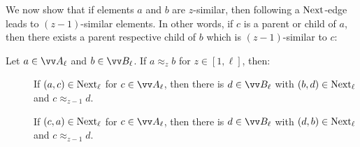 We now show that if elements $a$ and $b$ are $z$-similar, then following a $\mathrm{Next}$-edge leads to $(z-1)$-similar elements.
In other words, if $c$ is a parent or child of $a$, then there exists a parent respective child of $b$ which is $(z-1)$-similar to $c$:
\begin{lemma}
  Let $a \in \unraveldom{A}_{\ell}$ and $b \in \unraveldom{B}_{\ell}$. If $a \approx_{z} b$ for $z \in [1,\ell]$, then:
  \begin{description}
  \item[] If $(a, c) \in \mathrm{Next}_{\ell}$ for $c \in \unraveldom{A}_{\ell}$, then there is $d \in \unraveldom{B}_{\ell}$ with $(b, d) \in \mathrm{Next}_{\ell}$ and $c \approx_{z-1} d$.
  \item[] If $(c, a) \in \mathrm{Next}_{\ell}$ for $c \in \unraveldom{A}_{\ell}$, then there is $d \in \unraveldom{B}_{\ell}$ with $(d, b) \in \mathrm{Next}_{\ell}$ and $c \approx_{z-1} d$.
\end{description}
\end{lemma}
